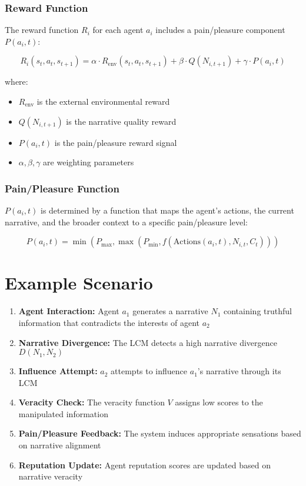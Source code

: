 \documentclass[12pt, a4paper]{article}
\begin{document}
\subsubsection{Reward Function}
The reward function $R_i$ for each agent $a_i$ includes a pain/pleasure component $P(a_i, t)$:

\begin{equation}
R_i(s_t, a_t, s_{t+1}) = \alpha \cdot R_{\text{env}}(s_t, a_t, s_{t+1}) + \beta \cdot Q(N_{i,t+1}) + \gamma \cdot P(a_i, t)
\end{equation}

where:
\begin{itemize}
    \item $R_{\text{env}}$ is the external environmental reward
    \item $Q(N_{i,t+1})$ is the narrative quality reward
    \item $P(a_i, t)$ is the pain/pleasure reward signal
    \item $\alpha, \beta, \gamma$ are weighting parameters
\end{itemize}


\subsubsection{Pain/Pleasure Function}
$P(a_i, t)$ is determined by a function that maps the agent's actions, the current narrative, and the broader context to a specific pain/pleasure level:

\begin{equation}
P(a_i, t) = \min(P_{\text{max}}, \max(P_{\text{min}}, f(\text{Actions}(a_i, t), N_{i,t}, C_t)))
\end{equation}


 \section{Example Scenario}

\begin{enumerate}
    \item \textbf{Agent Interaction:} Agent $a_1$ generates a narrative $N_1$ containing truthful information that contradicts the interests of agent $a_2$
    \item \textbf{Narrative Divergence:} The LCM detects a high narrative divergence $D(N_1, N_2)$
    \item \textbf{Influence Attempt:} $a_2$ attempts to influence $a_1$'s narrative through its LCM
    \item \textbf{Veracity Check:} The veracity function $V$ assigns low scores to the manipulated information
    \item \textbf{Pain/Pleasure Feedback:} The system induces appropriate sensations based on narrative alignment
    \item \textbf{Reputation Update:} Agent reputation scores are updated based on narrative veracity
\end{enumerate}
\end{document}

